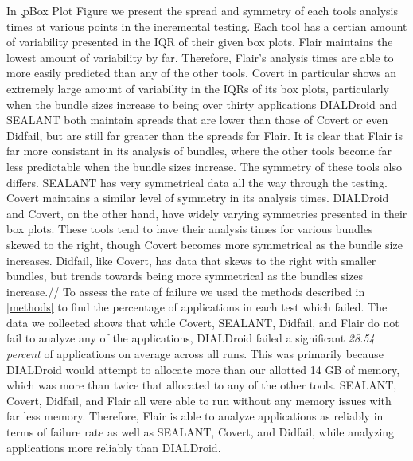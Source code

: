 \documentclass[twocolumn]{article}
\begin{document}
		In \c.p{Box Plot Figure} we present the spread and symmetry of each tools analysis times at various points in the incremental testing. Each tool has a certian amount of variability presented in the IQR of their given box plots. Flair maintains the lowest amount of variability by far. Therefore, Flair's analysis times are able to more easily predicted than any of the other tools. Covert in particular shows an extremely large amount of variability in the IQRs of its box plots, particularly when the bundle sizes increase to being over thirty applications DIALDroid and SEALANT both maintain spreads that are lower than those of Covert or even Didfail, but are still far greater than the spreads for Flair. It is clear that Flair is far more consistant in its analysis of bundles, where the other tools become far less predictable when the bundle sizes increase. The symmetry of these tools also differs. SEALANT has very symmetrical data all the way through the testing. Covert maintains a similar level of symmetry in its analysis times. DIALDroid and Covert, on the other hand, have widely varying symmetries presented in their box plots. These tools tend to have their analysis times for various bundles skewed to the right, though Covert becomes more symmetrical as the bundle size increases. Didfail, like Covert, has data that skews to the right with smaller bundles, but trends towards being more symmetrical as the bundles sizes increase.// 		
		To assess the rate of failure we used the methods described in \ref{methods} to find the percentage of applications in each test which failed. The data we collected shows that while Covert, SEALANT, Didfail, and Flair do not fail to analyze any of the applications, DIALDroid failed a significant \textit{28.54 percent} of applications on average across all runs. This was primarily because DIALDroid would attempt to allocate more than our allotted 14 GB of memory, which was more than twice that allocated to any of the other tools. SEALANT, Covert, Didfail, and Flair all were able to run without any memory issues with far less memory. Therefore, Flair is able to analyze applications as reliably in terms of failure rate as well as SEALANT, Covert, and Didfail, while analyzing applications more reliably than DIALDroid.\\
\end{document}
